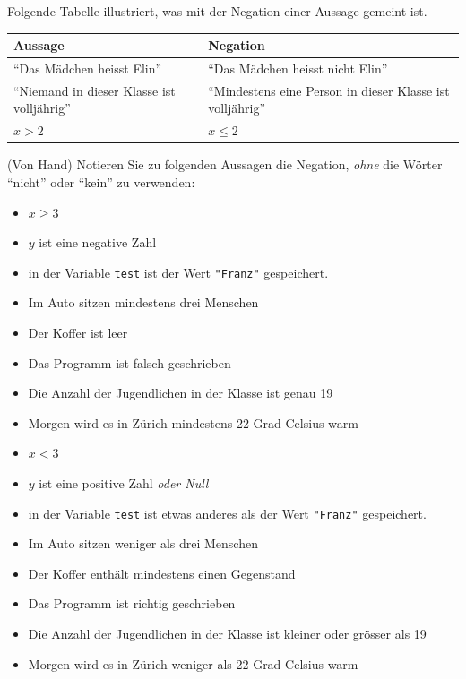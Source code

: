 \begin{myexample} Folgende Tabelle illustriert, was mit der Negation einer Aussage gemeint ist.
\begin{table}[H]
	\centering
	\begin{tabular}{p{7cm}p{7cm}}
		\textbf{Aussage}                                  & \textbf{Negation}                                                \\\midrule
		\enquote{Das Mädchen heisst Elin}                 & \enquote{Das Mädchen heisst nicht Elin}                          \\\midrule
		\enquote{Niemand in dieser Klasse ist volljährig} & \enquote{Mindestens eine Person in dieser Klasse ist volljährig} \\\midrule
		$x > 2$                                           & $x \leq 2$
	\end{tabular}
\end{table}
\end{myexample}
\begin{myexercise}
	(Von Hand) Notieren Sie zu folgenden Aussagen die Negation, \textit{ohne} die Wörter \enquote{nicht} oder \enquote{kein} zu verwenden:
	\begin{itemize}
		\item $x \geq 3$
		\item $y$ ist eine negative Zahl
		\item in der Variable \lstinline|test| ist der Wert \lstinline|"Franz"| gespeichert.
		\item Im Auto sitzen mindestens drei Menschen
		\item Der Koffer ist leer
		\item Das Programm ist falsch geschrieben
		\item Die Anzahl der Jugendlichen in der Klasse ist genau 19
		\item Morgen wird es in Zürich mindestens 22 Grad Celsius warm
	\end{itemize}
	\begin{myanswer}
		\begin{itemize}
			\item $x < 3$
			\item $y$ ist eine positive Zahl \textit{oder Null}
			\item in der Variable \lstinline|test| ist etwas anderes als der Wert \lstinline|"Franz"| gespeichert.
			\item Im Auto sitzen weniger als drei Menschen
			\item Der Koffer enthält mindestens einen Gegenstand
			\item Das Programm ist richtig geschrieben
			\item Die Anzahl der Jugendlichen in der Klasse ist kleiner oder grösser als 19
			\item Morgen wird es in Zürich weniger als 22 Grad Celsius warm
		\end{itemize}
	\end{myanswer}
\end{myexercise}
